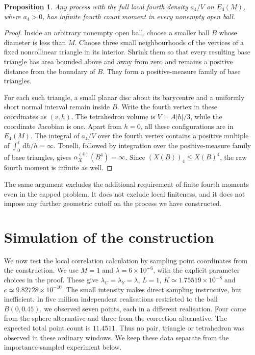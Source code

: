 \documentclass[11pt,a4paper]{article}
\numberwithin{equation}{section}
\newtheorem{proposition}[theorem]{Proposition}
\theoremstyle{definition}
\theoremstyle{remark}
\newcommand{\dd}{\,\mathrm d}
\begin{document}
\begin{proposition}\label{prop:fourth-infinite}
Any process with the full local fourth density $a_4/V$ on $E_4(M)$,
where $a_4>0$, has infinite fourth count moment in every nonempty open
ball.
\end{proposition}
\begin{proof}
Inside an arbitrary nonempty open ball, choose a smaller ball $B$ whose
diameter is less than $M$. Choose three small neighbourhoods of the
vertices of a fixed noncollinear triangle in its interior. Shrink them
so that every resulting base triangle has area bounded above and away
from zero and remains a positive distance from the boundary of $B$.
They form a positive-measure family of base triangles.

For each such triangle, a small planar disc about its barycentre and a
uniformly short normal interval remain inside $B$. Write the fourth
vertex in these coordinates as $(v,h)$. The tetrahedron volume is
$V=A|h|/3$, while the coordinate Jacobian is one. Apart from $h=0$, all
these configurations are in $E_4(M)$. The integral of $a_4/V$ over the
fourth vertex contains a positive multiple of
$\int_0^\varepsilon\dd h/h=\infty$. Tonelli, followed by integration
over the positive-measure family of base triangles, gives
$\alpha_X^{(4)}(B^4)=\infty$. Since $(X(B))_4\leq X(B)^4$, the raw
fourth moment is infinite as well.
\end{proof}

The same argument excludes the additional requirement of finite fourth
moments even in the capped problem. It does not exclude local finiteness,
and it does not impose any further geometric cutoff on the process we
have constructed.

\providecommand{\simulationdir}{simulation}
\section{Simulation of the construction}
\label{sec:simulation}

We now test the local correlation calculation by sampling point coordinates
from the construction. We use $M=1$ and $\lambda=6\times10^{-6}$, with the
explicit parameter choices in the proof. These give
$\lambda_C=\lambda_Y=\lambda$, $L=1$,
$K\simeq1.75519\times10^{-8}$ and $c\simeq9.82728\times10^{-10}$.
The small intensity makes direct sampling instructive, but inefficient.
In five million independent realisations restricted to the ball $B(0,0.45)$,
we observed seven points, each in a different realisation. Four came from
the sphere alternative and three from the correction alternative. The
expected total point count is $11.4511$. Thus no pair, triangle or tetrahedron
was observed in these ordinary windows. We keep these data separate from
the importance-sampled experiment below.
\end{document}
